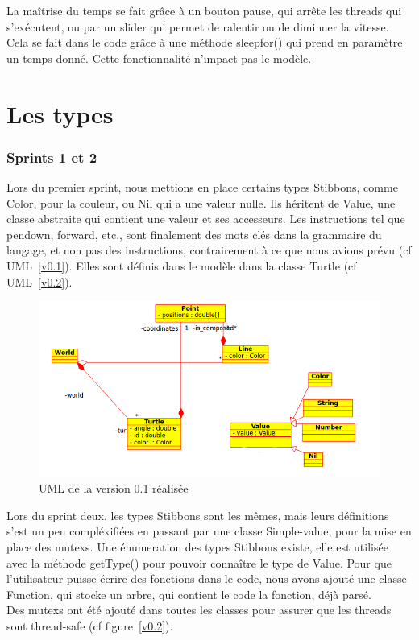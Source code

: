 La maîtrise du temps se fait grâce à un bouton pause, qui arrête les threads qui s'exécutent, ou par un slider qui permet de ralentir ou de diminuer la vitesse. Cela se fait dans le code grâce à une méthode sleepfor() qui prend en paramètre un temps donné. Cette fonctionnalité n'impact pas le modèle.

\section{Les types}
\subsubsection{Sprints 1 et 2}
Lors du premier sprint, nous mettions en place certains types Stibbons, comme Color, pour la couleur, ou Nil qui a une valeur nulle. Ils héritent de Value, une classe abstraite qui contient une valeur et ses accesseurs.
Les instructions tel que pendown, forward, etc., sont finalement des mots clés dans la grammaire du langage, et non pas des instructions, contrairement à ce que nous avions prévu (cf UML~\ref{v0.1}).
Elles sont définis dans le modèle dans la classe Turtle (cf UML~\ref{v0.2}).

\begin{figure}[h]
\includegraphics[scale=0.5]{doc/report/uml/v01reel.png}
\caption{\label{v0.1R} UML de la version 0.1 réalisée}
\end{figure}

Lors du sprint deux, les types Stibbons sont les mêmes, mais leurs définitions s'est un peu compléxifiées en passant par une classe Simple-value, pour la mise en place des mutexs. Une énumeration des types Stibbons existe, elle est utilisée avec la méthode getType() pour pouvoir connaître le type de Value.
Pour que l'utilisateur puisse écrire des fonctions dans le code, nous avons ajouté une classe Function, qui stocke un arbre, qui contient le code la fonction, déjà parsé.
\\ Des mutexs ont été ajouté dans toutes les classes pour assurer que les threads sont thread-safe (cf figure~\ref{v0.2}).

